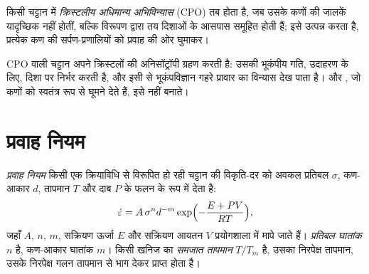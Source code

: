 \begin{definition}[क्रिस्टलीय अधिमान्य अभिविन्यास]\label{def:b3:deformation-mechanisms:cpo}
किसी चट्टान में \emph{क्रिस्टलीय अधिमान्य अभिविन्यास}
(CPO) तब होता है, जब उसके कणों की जालकें यादृच्छिक नहीं होतीं,
बल्कि विरूपण द्वारा तय दिशाओं के आसपास समूहित होती हैं;  इसे उत्पन्न करता है, प्रत्येक कण की सर्पण-प्रणालियों को प्रवाह की ओर घुमाकर।
\end{definition}

CPO वाली चट्टान अपने क्रिस्टलों की अनिसॉट्रॉपी ग्रहण करती है: उसकी भूकंपीय गति,
उदाहरण के लिए, दिशा पर निर्भर करती है, और इसी से भूकंपविज्ञान गहरे प्रावार का विन्यास
देख पाता है।  और , जो कणों को स्वतंत्र रूप से
घूमने देते हैं, इसे नहीं बनाते।

\section{प्रवाह नियम}

\begin{definition}[प्रवाह नियम, प्रतिबल घातांक, समजात तापमान]\label{def:b3:deformation-mechanisms:flow-law}
\emph{प्रवाह नियम} किसी एक क्रियाविधि से विरूपित हो रही चट्टान की विकृति-दर को
अवकल प्रतिबल $\sigma$, कण-आकार
$d$, तापमान $T$ और दाब $P$ के फलन के रूप में देता है:
\[
  \dot\varepsilon = A\,\sigma^nd^{-m}\exp\Bigl(-\frac{E + PV}{RT}\Bigr),
\]
जहाँ $A$, $n$, $m$, सक्रियण ऊर्जा $E$ और सक्रियण आयतन $V$
प्रयोगशाला में मापे जाते हैं। \emph{प्रतिबल घातांक}
$n$ है, कण-आकार घातांक $m$। किसी खनिज का \emph{समजात
तापमान} $T/T_m$ है, उसका
निरपेक्ष तापमान, उसके निरपेक्ष गलन तापमान से भाग देकर प्राप्त होता है।
\end{definition}

